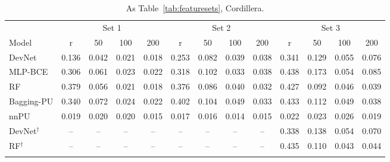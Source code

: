 \documentclass[pdflatex,sn-apa]{sn-jnl}
\begin{document}
\begin{appendices}
\begin{table}[!h]
\caption{As Table~\ref{tab:featuresets}, Cordillera.}\label{tab:featuresets-cord}
\scriptsize
\setlength{\tabcolsep}{1.5pt}
\begin{tabular*}{\textwidth}{@{\extracolsep\fill}lcccccccccccc}
\toprule
 & \multicolumn{4}{c}{Set 1} & \multicolumn{4}{c}{Set 2} & \multicolumn{4}{c}{Set 3} \\
\cmidrule(lr){2-5}\cmidrule(lr){6-9}\cmidrule(lr){10-13}
Model & r & 50 & 100 & 200 & r & 50 & 100 & 200 & r & 50 & 100 & 200 \\
\midrule
DevNet & 0.136 & 0.042 & 0.021 & 0.018 & 0.253 & 0.082 & 0.039 & 0.038 & 0.341 & 0.129 & 0.055 & 0.076 \\
MLP-BCE & 0.306 & 0.061 & 0.023 & 0.022 & 0.318 & 0.102 & 0.033 & 0.038 & 0.438 & 0.173 & 0.054 & 0.085 \\
RF & 0.379 & 0.056 & 0.021 & 0.018 & 0.376 & 0.086 & 0.040 & 0.032 & 0.427 & 0.092 & 0.046 & 0.039 \\
Bagging-PU & 0.340 & 0.072 & 0.024 & 0.022 & 0.402 & 0.104 & 0.049 & 0.033 & 0.433 & 0.112 & 0.049 & 0.038 \\
nnPU & 0.019 & 0.020 & 0.020 & 0.015 & 0.017 & 0.016 & 0.014 & 0.015 & 0.022 & 0.023 & 0.026 & 0.019 \\
DevNet$^\dagger$ & -- & -- & -- & -- & -- & -- & -- & -- & 0.338 & 0.138 & 0.054 & 0.070 \\
RF$^\dagger$ & -- & -- & -- & -- & -- & -- & -- & -- & 0.435 & 0.110 & 0.043 & 0.044 \\
\botrule
\end{tabular*}
\end{table}


\end{appendices}
\end{document}

